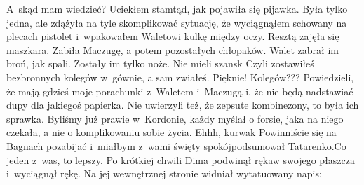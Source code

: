 \documentclass[../MAIN.tex]{subfiles}
\begin{document}
\xx A~skąd mam wiedzieć? Uciekłem stamtąd, jak pojawiła się pijawka. Była tylko jedna, ale zdążyła na tyle skomplikować sytuację, że wyciągnąłem schowany na plecach pistolet i~wpakowałem Waletowi kulkę między oczy. Resztą zajęła się maszkara. Zabiła Maczugę, a potem pozostałych chłopaków. Walet zabrał im broń, jak spali. Zostały im tylko noże. Nie mieli szans\3k
\xx Czyli zostawiłeś bezbronnych kolegów w~gównie, a sam zwiałeś. Pięknie!
\xx Kolegów??? Powiedzieli, że mają gdzieś moje porachunki z~Waletem i~Maczugą i, że nie będą nadstawiać dupy dla jakiegoś papierka. Nie uwierzyli też, że zepsute kombinezony, to była ich sprawka. Byliśmy już prawie w~Kordonie, każdy myślał o forsie, jaka na niego czekała, a nie o komplikowaniu sobie życia.
\xx Ehhh, kurwa\3k Powinniście się na Bagnach pozabijać i~miałbym z~wami święty spokój\x podsumował Tatarenko.\x Co jeden z~was, to lepszy.
\qm
Po krótkiej chwili Dima podwinął rękaw swojego płaszcza
i~wyciągnął rękę. Na jej wewnętrznej stronie widniał
wytatuowany napis:
\end{document}
